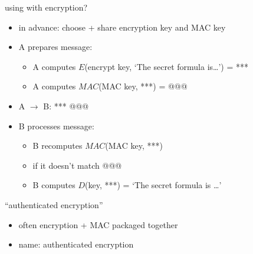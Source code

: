 \begin{frame}{using with encryption?}
    \begin{itemize}
    \item in advance: choose + share encryption key and MAC key
    \vspace{.5cm}
    \item A prepares message:
    \begin{itemize}
    \item A computes $E$(encrypt key, `The secret formula is\ldots') = ***
    \item A computes $MAC$(MAC key, ***) = @@@
    \end{itemize}
    \item A $\rightarrow$ B: *** @@@
    \item<2-> B processes message:
    \begin{itemize}
        \item B recomputes $MAC$(MAC key, ***)
        \item {} if it doesn't match @@@
        \item B computes $D$(key, ***) = `The secret formula is \ldots'
    \end{itemize}
    \end{itemize}
\end{frame}

\begin{frame}{``authenticated encryption''}
    \begin{itemize}
    \item often encryption + MAC packaged together 
    \item name: authenticated encryption
    \end{itemize}
\end{frame}
